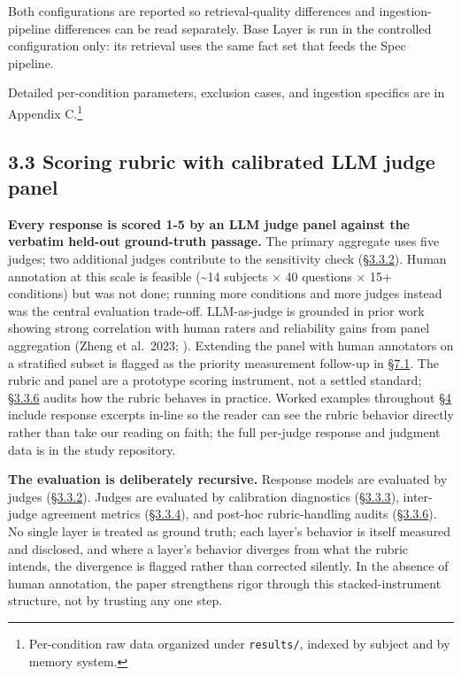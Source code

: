 Both configurations are reported so retrieval-quality differences and
ingestion-pipeline differences can be read separately. Base Layer is run
in the controlled configuration only: its retrieval uses the same fact
set that feeds the Spec pipeline.

Detailed per-condition parameters, exclusion cases, and ingestion
specifics are in Appendix C.\footnote{Per-condition raw data organized
  under \texttt{results/}, indexed by subject and by memory system.}

\hypertarget{scoring-rubric-with-calibrated-llm-judge-panel}{%
\subsection{3.3 Scoring rubric with calibrated LLM judge
panel}\label{scoring-rubric-with-calibrated-llm-judge-panel}}

\textbf{Every response is scored 1-5 by an LLM judge panel against the
verbatim held-out ground-truth passage.} The primary aggregate uses five
judges; two additional judges contribute to the sensitivity check
(\hyperref[judge-panel]{§3.3.2}). Human annotation at this scale is feasible (\textasciitilde14
subjects × 40 questions × 15+ conditions) but was not done; running more
conditions and more judges instead was the central evaluation trade-off.
LLM-as-judge is grounded in prior work showing strong correlation with
human raters and reliability gains from panel aggregation (Zheng et
al.~2023; \citet{verga2024juries}). Extending the panel with human annotators
on a stratified subset is flagged as the priority measurement follow-up
in \hyperref[subject-and-corpus-expansion]{§7.1}. The rubric and panel are a prototype scoring instrument, not a
settled standard; \hyperref[rubric-handling-limitations-post-hoc-validity-audit]{§3.3.6} audits how the rubric behaves in practice.
Worked examples throughout \hyperref[results]{§4} include response
excerpts in-line so the reader can see the rubric behavior directly
rather than take our reading on faith; the full per-judge response and
judgment data is in the study repository.

\textbf{The evaluation is deliberately recursive.} Response models are
evaluated by judges (\hyperref[judge-panel]{§3.3.2}). Judges are evaluated by calibration
diagnostics (\hyperref[calibration]{§3.3.3}), inter-judge agreement metrics (\hyperref[inter-judge-agreement]{§3.3.4}), and
post-hoc rubric-handling audits (\hyperref[rubric-handling-limitations-post-hoc-validity-audit]{§3.3.6}). No single layer is treated as
ground truth; each layer's behavior is itself measured and disclosed,
and where a layer's behavior diverges from what the rubric intends, the
divergence is flagged rather than corrected silently. In the absence of
human annotation, the paper strengthens rigor through this
stacked-instrument structure, not by trusting any one step.

